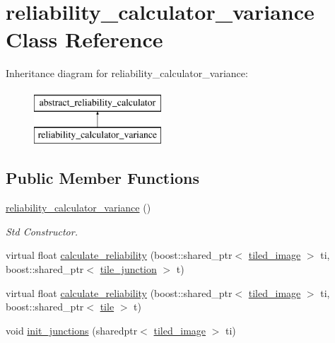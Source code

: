 \hypertarget{classreliability__calculator__variance}{\section{reliability\-\_\-calculator\-\_\-variance Class Reference}
\label{classreliability__calculator__variance}
}
Inheritance diagram for reliability\-\_\-calculator\-\_\-variance\-:\begin{figure}[H]
\begin{center}
\leavevmode
\includegraphics[height=2.000000cm]{classreliability__calculator__variance}
\end{center}
\end{figure}
\subsection*{Public Member Functions}
\begin{DoxyCompactItemize}
\item 
\hypertarget{classreliability__calculator__variance_aa97b8fa061b578f6be66a89afba64657}{\hyperlink{classreliability__calculator__variance_aa97b8fa061b578f6be66a89afba64657}{reliability\-\_\-calculator\-\_\-variance} ()}\label{classreliability__calculator__variance_aa97b8fa061b578f6be66a89afba64657}

\begin{DoxyCompactList}\small\item\em Std Constructor. \end{DoxyCompactList}\item 
virtual float \hyperlink{classreliability__calculator__variance_ac6380a3bedfdc5648f501cd0a5c92369}{calculate\-\_\-reliability} (boost\-::shared\-\_\-ptr$<$ \hyperlink{classtiled__image}{tiled\-\_\-image} $>$ ti, boost\-::shared\-\_\-ptr$<$ \hyperlink{classtile__junction}{tile\-\_\-junction} $>$ t)
\item 
virtual float \hyperlink{classreliability__calculator__variance_a0250bc0b9f2d62ec48b66449d6f94b56}{calculate\-\_\-reliability} (boost\-::shared\-\_\-ptr$<$ \hyperlink{classtiled__image}{tiled\-\_\-image} $>$ ti, boost\-::shared\-\_\-ptr$<$ \hyperlink{classtile}{tile} $>$ t)
\item 
void \hyperlink{classreliability__calculator__variance_ad371792568036db7a8dac6fabbb78d05}{init\-\_\-junctions} (sharedptr$<$ \hyperlink{classtiled__image}{tiled\-\_\-image} $>$ ti)
\end{DoxyCompactItemize}


